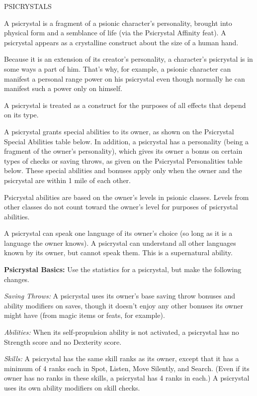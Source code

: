 \documentclass{article}
\begin{document}
\vspace{12pt}
PSICRYSTALS

A psicrystal is a fragment of a psionic character's personality, brought into physical 
form and a semblance of life (via the Psicrystal Affinity feat). A psicrystal appears 
as a crystalline construct about the size of a human hand.

Because it is an extension of its creator's personality, a character's psicrystal 
is in some ways a part of him. That's why, for example, a psionic character can 
manifest a personal range power on his psicrystal even though normally he can manifest 
such a power only on himself.

A psicrystal is treated as a construct for the purposes of all effects that depend 
on its type.

A psicrystal grants special abilities to its owner, as shown on the Psicrystal 
Special Abilities table below. In addition, a psicrystal has a personality (being 
a fragment of the owner's personality), which gives its owner a bonus on certain 
types of checks or saving throws, as given on the Psicrystal Personalities table 
below. These special abilities and bonuses apply only when the owner and the psicrystal 
are within 1 mile of each other.

Psicrystal abilities are based on the owner's levels in psionic classes. Levels 
from other classes do not count toward the owner's level for purposes of psicrystal 
abilities.

A psicrystal can speak one language of its owner's choice (so long as it is a language 
the owner knows). A psicrystal can understand all other languages known by its 
owner, but cannot speak them. This is a supernatural ability.

\textbf{Psicrystal Basics: }Use the statistics for a psicrystal, but make the following 
changes.

\textit{Saving Throws: }A psicrystal uses its owner's base saving throw bonuses 
and ability modifiers on saves, though it doesn't enjoy any other bonuses its owner 
might have (from magic items or feats, for example).

\textit{Abilities: }When its self-propulsion ability is not activated, a psicrystal 
has no Strength score and no Dexterity score. 

\textit{Skills: }A psicrystal has the same skill ranks as its owner, except that 
it has a minimum of 4 ranks each in Spot, Listen, Move Silently, and Search. (Even 
if its owner has no ranks in these skills, a psicrystal has 4 ranks in each.) A 
psicrystal uses its own ability modifiers on skill checks.
\end{document}
